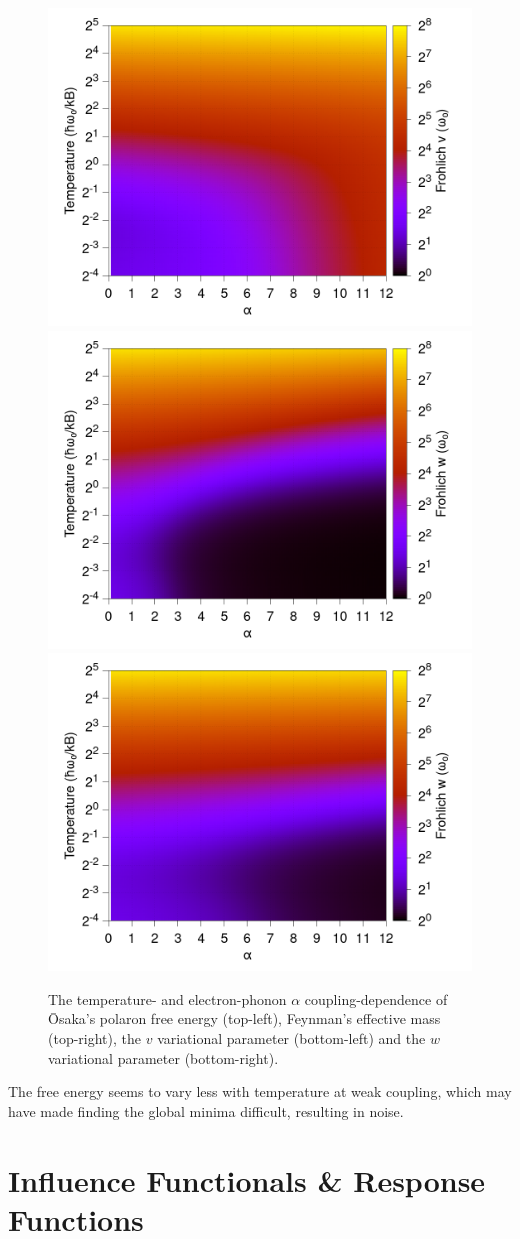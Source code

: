 \begin{figure}[ht]
    \includegraphics[width = .49\textwidth]{figures/frohlich-3d-v-temp-00625to32-contourf.png}
    \includegraphics[width = .49\textwidth]{figures/frohlich-2d-w-temp-00625to32-contourf.png}
    \includegraphics[width = .49\textwidth]{figures/frohlich-3d-w-temp-00625to32-contourf.png}
    \caption{The temperature- and electron-phonon $\alpha$ coupling-dependence of \=Osaka's polaron free energy (top-left), Feynman's effective mass (top-right), the $v$ variational parameter (bottom-left) and the $w$ variational parameter (bottom-right).}
    \label{fig-2252-2:thermaltheorycontour}
\end{figure}
\FloatBarrier  

The free energy seems to vary less with temperature at weak coupling, which may have made finding the global minima difficult, resulting in noise.

\section{Influence Functionals \& Response Functions}
\label{sec:2-3}


